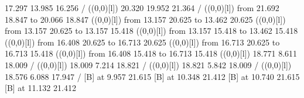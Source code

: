 {{\color[rgb]{0,0,0} 17.297 13.985 16.256 /
}%
%
%
\linethickness=1pt
\setplotsymbol ({\makebox(0,0)[l]{\tencirc{}}})
{\color[rgb]{0,0,0} 20.320 19.952 21.364 /
}%
%
%
\linethickness=1pt
\setplotsymbol ({\makebox(0,0)[l]{\tencirc{}}})
{\color[rgb]{0,0,0}\putrule from 21.692 18.847 to 20.066 18.847
}%
%
%
\linethickness=1pt
\setplotsymbol ({\makebox(0,0)[l]{\tencirc{}}})
{\color[rgb]{0,0,0}\putrule from 13.157 20.625 to 13.462 20.625
}%
%
%
\linethickness=1pt
\setplotsymbol ({\makebox(0,0)[l]{\tencirc{}}})
{\color[rgb]{0,0,0}\putrule from 13.157 20.625 to 13.157 15.418
}%
%
%
\linethickness=1pt
\setplotsymbol ({\makebox(0,0)[l]{\tencirc{}}})
{\color[rgb]{0,0,0}\putrule from 13.157 15.418 to 13.462 15.418
}%
%
%
\linethickness=1pt
\setplotsymbol ({\makebox(0,0)[l]{\tencirc{}}})
{\color[rgb]{0,0,0}\putrule from 16.408 20.625 to 16.713 20.625
}%
%
%
\linethickness=1pt
\setplotsymbol ({\makebox(0,0)[l]{\tencirc{}}})
{\color[rgb]{0,0,0}\putrule from 16.713 20.625 to 16.713 15.418
}%
%
%
\linethickness=1pt
\setplotsymbol ({\makebox(0,0)[l]{\tencirc{}}})
{\color[rgb]{0,0,0}\putrule from 16.408 15.418 to 16.713 15.418
}%
%
%
\linethickness=1pt
\setplotsymbol ({\makebox(0,0)[l]{\tencirc{}}})
{\color[rgb]{0,0,0} 18.771  8.611 18.009 /
}%
%
%
\linethickness=1pt
\setplotsymbol ({\makebox(0,0)[l]{\tencirc{}}})
{\color[rgb]{0,0,0} 18.009  7.214 18.821 /
}%
%
%
\linethickness=1pt
\setplotsymbol ({\makebox(0,0)[l]{\tencirc{}}})
{\color[rgb]{0,0,0} 18.821  5.842 18.009 /
}%
%
%
\linethickness=1pt
\setplotsymbol ({\makebox(0,0)[l]{\tencirc{}}})
{\color[rgb]{0,0,0} 18.576  6.088 17.947 /
}%
%
%
 [B] at  9.957 21.615
%
%
 [B] at 10.348 21.412
%
%
 [B] at 10.740 21.615
%
%
 [B] at 11.132 21.412
}
